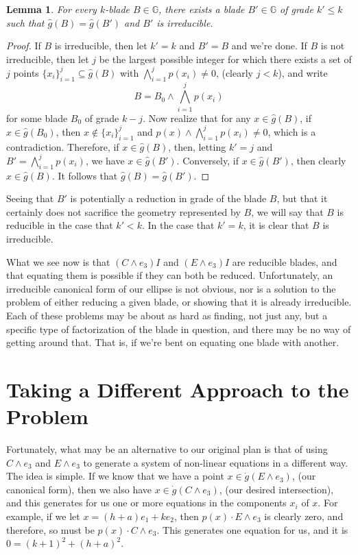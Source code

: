 \documentclass{birkjour}
\newtheorem{lem}[thm]{Lemma}
\theoremstyle{definition}
\theoremstyle{remark}
\numberwithin{equation}{section}
\newcommand{\G}{\mathbb{G}}
\newcommand{\gd}{\dot{g}}
\newcommand{\gh}{\hat{g}}
\begin{document}
\begin{lem}
For every $k$-blade $B\in\G$, there exists a blade $B'\in\G$ of grade $k'\leq k$
such that $\gh(B)=\gh(B')$ and $B'$ is irreducible.
\end{lem}
\begin{proof}
If $B$ is irreducible, then let $k'=k$ and $B'=B$ and we're done.
If $B$ is not irreducible, then let $j$ be the largest possible integer
for which there exists a set of $j$ points $\{x_i\}_{i=1}^j\subseteq\gh(B)$
with $\bigwedge_{i=1}^j p(x_i)\neq 0$, (clearly $j<k$), and write
\begin{equation*}
B = B_0\wedge\bigwedge_{i=1}^j p(x_i)
\end{equation*}
for some blade $B_0$ of grade $k-j$.  Now realize that for any $x\in\gh(B)$,
if $x\in\gh(B_0)$, then $x\not\in\{x_i\}_{i=1}^j$ and $p(x)\wedge\bigwedge_{i=1}^j p(x_i)\neq 0$,
which is a contradiction.  Therefore, if $x\in\gh(B)$, then, letting $k'=j$ and $B'=\bigwedge_{i=1}^jp(x_i)$,
we have $x\in\gh(B')$.  Conversely, if $x\in\gh(B')$, then clearly $x\in\gh(B)$.  It follows that
$\gh(B)=\gh(B')$.
\end{proof}

Seeing that $B'$ is potentially a reduction in grade of the blade $B$, but that it certainly does
not sacrifice the geometry represented by $B$, we will say that $B$ is reducible
in the case that $k'<k$.  In the case that $k'=k$, it is clear that $B$ is irreducible.

What we see now is that $(C\wedge e_3)I$ and $(E\wedge e_3)I$ are reducible blades,
and that equating them is possible if they can both be reduced.  Unfortunately,
an irreducible canonical form of our ellipse is not obvious, nor is a solution to the problem
of either reducing a given blade, or showing that it is already irreducible.  Each of these
problems may be about as hard  as finding, not just any, but a specific type of factorization
of the blade in question, and there may be no
way of getting around that.  That is, if we're bent on equating one blade with another.

\section{Taking a Different Approach to the Problem}

Fortunately, what may be an alternative to our original plan is that of using
$C\wedge e_3$ and $E\wedge e_3$ to generate a system of non-linear
equations in a different way.  The idea is simple.  If we know that we have a point $x\in\gd(E\wedge e_3)$, (our
canonical form), then we also have $x\in\gd(C\wedge e_3)$, (our desired intersection), and this generates
for us one or more equations in the components $x_i$ of $x$.  For example,
if we let $x=(h+a)e_1 + ke_2$, then $p(x)\cdot E\wedge e_3$ is clearly
zero, and therefore, so must be $p(x)\cdot C\wedge e_3$.
This generates one equation for us, and it is $0=(k+1)^2+(h+a)^2$.
\end{document}
